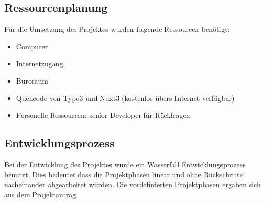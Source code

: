 \subsection{Ressourcenplanung}
\label{sec:Ressourcenplanung}

Für die Umsetzung des Projektes wurden folgende Ressourcen benötigt:
\begin{itemize}
	\item Computer
	\item Internetzugang
	\item Büroraum
	\item Quellcode von Typo3 und Nuxt3 (kostenlos übers Internet verfügbar)
	\item Personelle Ressourcen: senior Developer für Rückfragen
\end{itemize}

\subsection{Entwicklungsprozess}
\label{sec:Entwicklungsprozess}

Bei der Entwicklung des Projektes wurde ein Wasserfall Entwicklungsprozess benutzt. Dies bedeutet dass die Projektphasen linear und ohne Rückschritte nacheinander abgearbeitet wurden. Die vordefinierten Projektphasen ergaben sich aus dem Projektantrag.
